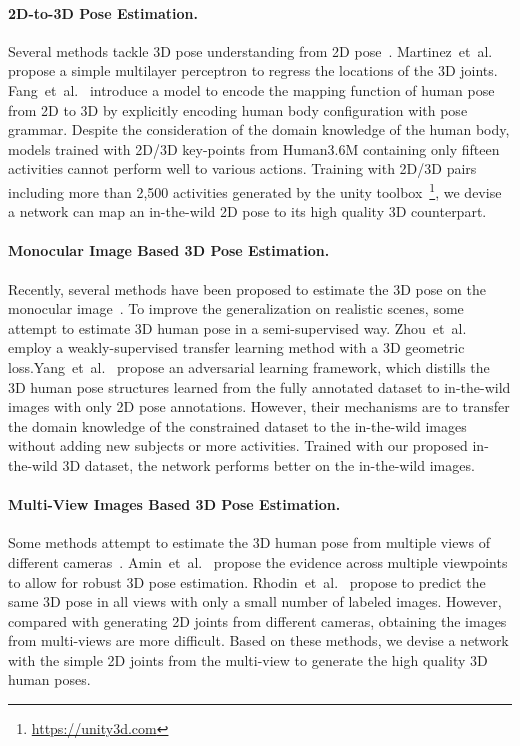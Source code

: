 \documentclass[10pt,twocolumn,letterpaper]{article}
\def\etal{et~al.\xspace}
\begin{document}
\paragraph{2D-to-3D Pose Estimation.}\vspace{-2mm}
Several methods tackle 3D pose understanding from 2D pose~\cite{ akhter2015pose,fan2014pose,lee1985determination, ramakrishna2012reconstructing, taylor2000reconstruction, wang2014robust, yasin2016dual, zhou20153d}.
Martinez~\etal~\cite{martinez2017simple} propose a simple multilayer perceptron to regress the locations of the 3D joints.
Fang~\etal~\cite{fang2017learning} introduce a model to encode the mapping function of human pose from 2D to 3D by explicitly encoding human body configuration with pose grammar. 
Despite the consideration of the domain knowledge of the human body, models trained with 2D/3D key-points from Human3.6M containing only fifteen activities cannot perform well to various actions. 
Training with 2D/3D pairs including more than 2,500 activities generated by the unity toolbox~\footnote{\url{https://unity3d.com}}, we devise a network can map an in-the-wild 2D pose to its high quality 3D counterpart. 
\paragraph{Monocular Image Based 3D Pose Estimation.}\vspace{-2mm}
Recently, several methods have been proposed to estimate the 3D pose on the monocular image~\cite{ionescu2014iterated,li20143d, mehta2017monocular, pavlakos2017coarse, sun2017compositional, tekin2017learning, tome2017lifting, zhou2016deep}.
To improve the generalization on realistic scenes, some attempt to estimate 3D human pose in a semi-supervised way.
Zhou~\etal~\cite{zhou2017towards} employ a weakly-supervised transfer learning method with a 3D geometric loss.Yang~\etal~\cite{yang20183d} propose an adversarial learning framework, which distills the 3D human pose structures learned from the fully annotated dataset to in-the-wild images with only 2D pose annotations.
However, their mechanisms are to transfer the domain knowledge of the constrained dataset to the in-the-wild images without adding new subjects or more activities.
Trained with our proposed in-the-wild 3D dataset, the network performs better on the in-the-wild images.
\paragraph{Multi-View Images Based 3D Pose Estimation.}\vspace{-2mm}
Some methods attempt to estimate the 3D human pose from multiple views of different cameras~\cite{amin2013multi,hofmann2012multi,holte2012human,rhodin2018learning}.
Amin~\etal~\cite{amin2013multi} propose the evidence across multiple viewpoints to allow for robust 3D pose
estimation.
Rhodin~\etal~\cite{rhodin2018learning} propose to predict the same 3D pose in all views with only a small number of labeled images.
However, compared with generating 2D joints from different cameras, obtaining the images from multi-views are more difficult. 
Based on these methods, we devise a network with the simple 2D joints from the multi-view to generate the high quality 3D human poses.
\end{document}
